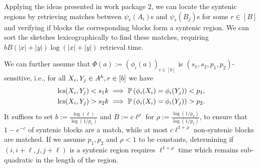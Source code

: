 Applying the ideas presented in work package 2, we can locate the syntenic regions by retrieving matches between $\psi_r(A_i)$s and $\psi_r(B_j)$s for some $r\in[B]$ and verifying if blocks the corresponding blocks form a syntenic region. We can sort the sketches lexicographically to find these matches, requiring $b B (|x|+|y|)\log(|x|+|y|)$ retrieval time. 

We can further assume that $\Phi(a):=(\phi_i(a))_{i\in[b]}$ is $(s_1,s_2, p_1, p_2)$-sensitive, i.e., for all $ X_i,Y_j\in A^k, r\in[b]$ we have
\begin{align}
    &\operatorname{\mathrm{lcs}}(X_i,Y_j)<s_1 k \implies \mathbb{P}\left( \phi_i(X_i)=\phi_i(Y_j) \right) < p_1, \\
    &\operatorname{\mathrm{lcs}}(X_i,Y_j)>s_2 k \implies \mathbb{P}\left( \phi_i(X_i)=\phi_i(Y_j) \right) > p_2.
\end{align}
It suffices to set $b:=\frac{\log(\ell)}{\log(1/p_1)}$ and $B:=c \ell^\rho$ for $\rho:=\frac{\log(1/p_2)}{\log(1/p_1)}$, to ensure that $1-e^{-c}$ of syntenic blocks are a match, while at most $c \ell^{1+\rho} $ non-syntenic blocks are matched. If we assume $p_1, p_2$ and $\rho < 1$ to be constants, determining if $(i,i+\ell, j, j+\ell)$ is a syntenic region requires $\ell^{1+\rho}$ time which remains sub-quadratic in the length of the region.  






